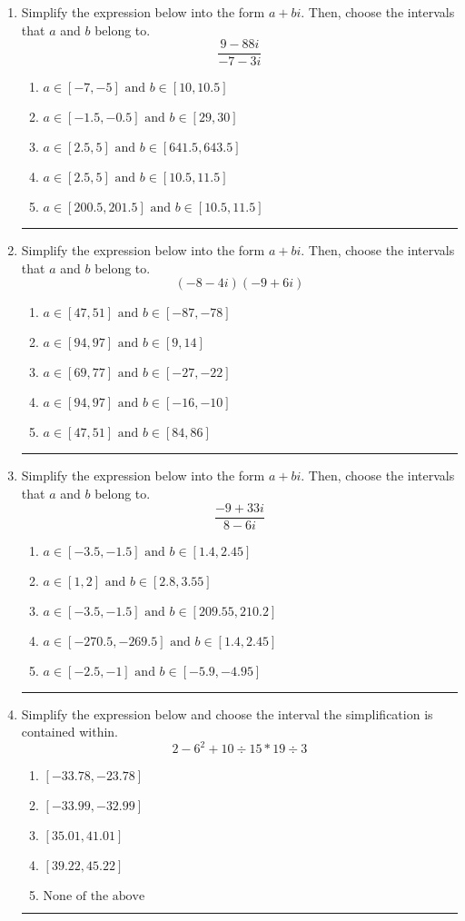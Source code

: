 \documentclass[14pt]{extbook}
\newcommand{\litem}[1]{\item#1\hspace*{-1cm}\rule{\textwidth}{0.4pt}}
\begin{document}
\begin{enumerate}
{\begin{enumerate}[label=\Alph*.]
\end{enumerate} }
\litem{
Simplify the expression below into the form $a+bi$. Then, choose the intervals that $a$ and $b$ belong to.\[ \frac{9 - 88 i}{-7 - 3 i} \]\begin{enumerate}[label=\Alph*.]
\item \( a \in [-7, -5] \text{ and } b \in [10, 10.5] \)
\item \( a \in [-1.5, -0.5] \text{ and } b \in [29, 30] \)
\item \( a \in [2.5, 5] \text{ and } b \in [641.5, 643.5] \)
\item \( a \in [2.5, 5] \text{ and } b \in [10.5, 11.5] \)
\item \( a \in [200.5, 201.5] \text{ and } b \in [10.5, 11.5] \)

\end{enumerate} }
\litem{
Simplify the expression below into the form $a+bi$. Then, choose the intervals that $a$ and $b$ belong to.\[ (-8 - 4 i)(-9 + 6 i) \]\begin{enumerate}[label=\Alph*.]
\item \( a \in [47, 51] \text{ and } b \in [-87, -78] \)
\item \( a \in [94, 97] \text{ and } b \in [9, 14] \)
\item \( a \in [69, 77] \text{ and } b \in [-27, -22] \)
\item \( a \in [94, 97] \text{ and } b \in [-16, -10] \)
\item \( a \in [47, 51] \text{ and } b \in [84, 86] \)

\end{enumerate} }
\litem{
Simplify the expression below into the form $a+bi$. Then, choose the intervals that $a$ and $b$ belong to.\[ \frac{-9 + 33 i}{8 - 6 i} \]\begin{enumerate}[label=\Alph*.]
\item \( a \in [-3.5, -1.5] \text{ and } b \in [1.4, 2.45] \)
\item \( a \in [1, 2] \text{ and } b \in [2.8, 3.55] \)
\item \( a \in [-3.5, -1.5] \text{ and } b \in [209.55, 210.2] \)
\item \( a \in [-270.5, -269.5] \text{ and } b \in [1.4, 2.45] \)
\item \( a \in [-2.5, -1] \text{ and } b \in [-5.9, -4.95] \)

\end{enumerate} }
\litem{
Simplify the expression below and choose the interval the simplification is contained within.\[ 2 - 6^2 + 10 \div 15 * 19 \div 3 \]\begin{enumerate}[label=\Alph*.]
\item \( [-33.78, -23.78] \)
\item \( [-33.99, -32.99] \)
\item \( [35.01, 41.01] \)
\item \( [39.22, 45.22] \)
\item \( \text{None of the above} \)


\end{enumerate}}
\end{enumerate}
\end{document}
